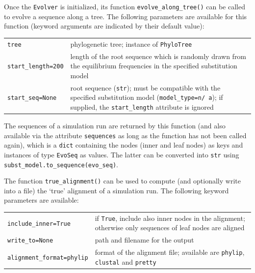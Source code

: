 \documentclass[hidelinks,11pt]{article}
\newcommand{\sq}{\textquotesingle}
\begin{document}
Once the \texttt{Evolver} is initialized, its function \texttt{evolve\_along\_tree()} can be called to evolve a sequence along a tree.
The following parameters are available for this function (keyword arguments are indicated by their default value):

\vspace{3mm}
{\small\centering
	\begin{longtable}{ p{4.5cm} p{9cm} }
		\texttt{tree} & phylogenetic tree; instance of \texttt{PhyloTree}\\
		\texttt{start\_length=200} & length of the root sequence which is randomly drawn from the equilibrium frequencies in the specified substitution model\\
		\texttt{start\_seq=None} & root sequence (\texttt{str}); must be compatible
		with the specified substitution model (\texttt{model\_type=\sq n\sq/\sq
		a\sq}); if supplied, the \texttt{start\_length} attribute is ignored\\
	\end{longtable}
}
\vspace{3mm}

\noindent
The sequences of a simulation run are returned by this function (and also available via the attribute \texttt{sequences} as long as the function has not been called again), which is a \texttt{dict} containing the nodes (inner and leaf nodes) as keys and instances of type \texttt{EvoSeq} as values.
The latter can be converted into \texttt{str} using \texttt{subst\_model.to\_sequence(evo\_seq)}.

The function \texttt{true\_alignment()} can be used to compute (and optionally write into a file) the `true' alignment of a simulation run.
The following keyword parameters are available:

\vspace{3mm}
{\small\centering
	\begin{longtable}{ p{4.5cm} p{9cm} }
		\texttt{include\_inner=True} & if \texttt{True}, include also inner nodes in the alignment; otherwise only sequences of leaf nodes are aligned\\
		\texttt{write\_to=None} & path and filename for the output\\
		\texttt{alignment\_format=\newline \sq phylip\sq} & format of the alignment
		file; available are \texttt{\sq phylip\sq}, \texttt{\sq clustal\sq} and
		\texttt{\sq pretty\sq}\\
	\end{longtable}
}
\vspace{3mm}
\end{document}
